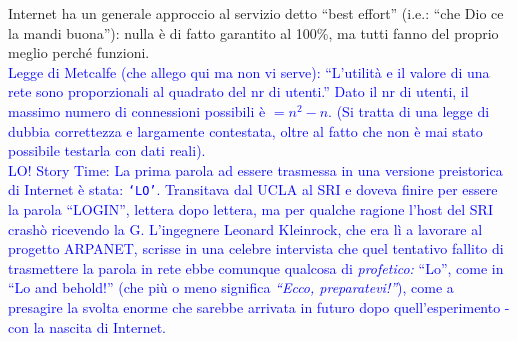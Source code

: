 \noindent {}Internet ha un generale approccio al servizio detto ``best effort'' (i.e.: ``che Dio ce la mandi buona''): nulla è di fatto garantito al 100\%, ma tutti fanno del proprio meglio perché funzioni.\\
\newpage
\noindent {}\textcolor{Blue}{Legge di Metcalfe (che allego qui ma non vi serve): ``L'utilità e il valore di una rete sono proporzionali al quadrato del nr di utenti.'' Dato il nr di utenti, il massimo numero di connessioni possibili è $= n^2 - n$. (Si tratta di una legge di dubbia correttezza e largamente contestata, oltre al fatto che non è mai stato possibile testarla con dati reali).}\\

\noindent \textcolor{Blue}{LO! Story Time: La prima parola ad essere trasmessa in una versione preistorica di Internet è stata: \texttt{`LO'}. Transitava dal UCLA al SRI e doveva finire per essere la parola ``LOGIN'', lettera dopo lettera, ma per qualche ragione l'host del SRI crashò ricevendo la G. L'ingegnere Leonard Kleinrock, che era lì a lavorare al progetto ARPANET, scrisse in una celebre intervista che quel tentativo fallito di trasmettere la parola in rete ebbe comunque qualcosa di \textit{profetico:} ``Lo'', come in ``Lo and behold!'' (che più o meno significa \textit{``Ecco, preparatevi!''}), come a presagire la svolta enorme che sarebbe arrivata in futuro dopo quell'esperimento - con la nascita di Internet.}